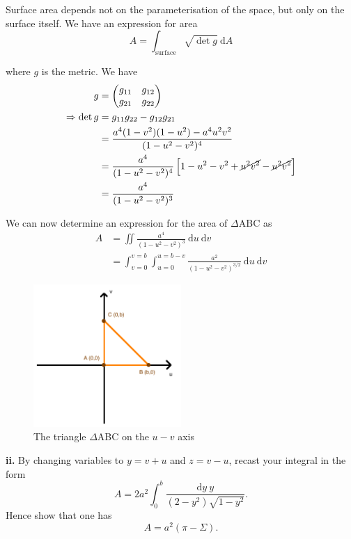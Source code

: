 \documentclass[a4paper]{article} %
\newcommand{\pmx}[1]{\begin{pmatrix}#1\end{pmatrix}}
\begin{document}
Surface area depends not on the parameterisation of the space, but only on the surface itself. We have an expression for area
\begin{equation}
A=\int_{\text{surface}}\sqrt{\det g}~\text{d}A
\end{equation}

where $g$ is the metric. We have
\begin{align}
g&=\pmx{g_{11}&g_{12}\\g_{21}&g_{22}}\\
\Rightarrow \det g&=g_{11}g_{22}-g_{12}g_{21}\\
&=\frac{a^4(1-v^2)(1-u^2)-a^4 u^2 v^2}{(1-u^2-v^2)^4}\\
&=\frac{a^4}{(1-u^2-v^2)^4}\left[1-u^2-v^2+\cancel{u^2 v^2}-\cancel{u^2 v^2}\right]\\
&=\frac{a^4}{(1-u^2-v^2)^3}
\end{align}

We can now determine an expression for the area of $\Delta$ABC as
\begin{align}
A&=\iint \frac{a^4}{(1-u^2-v^2)^3}~\text{d}u~\text{d}v\\
&=\int_{v=0}^{v=b}\int_{u=0}^{u=b-v}\frac{a^2}{(1-u^2-v^2)^{3/2}}~\text{d}u~\text{d}v\label{abc area uv}
\end{align}

\begin{figure}[h]
\centering
\includegraphics[width=0.5\textwidth]{images/fi.png}
\caption{The triangle $\Delta$ABC on the $u-v$ axis}
\label{fi figure}
\end{figure}



\begin{framed}
\textbf{ii.} By changing variables to $y=v+u$ and $z=v-u$, recast your integral in the form
\begin{equation}
A=2a^2\int^b_0 \frac{\text{d}y~y}{(2-y^2)\sqrt{1-y^2}}.
\end{equation}
Hence show that one has
\begin{equation}
A=a^2(\pi-\Sigma).\label{A(pi,Sigma)}
\end{equation}
\end{framed}
\end{document}
